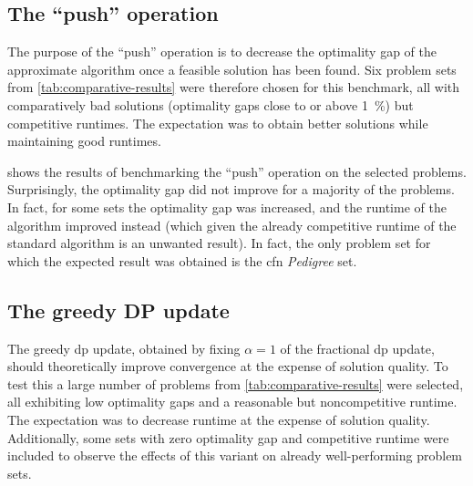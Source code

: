\subsection{The \enquote{push} operation}
The purpose of the \enquote{push} operation is to decrease the optimality gap of the approximate algorithm once a feasible solution has been found.
Six problem sets from \cref{tab:comparative-results} were therefore chosen for this benchmark, all with comparatively bad solutions (optimality gaps close to or above \SI{1}{\percent}) but competitive runtimes.
The expectation was to obtain better solutions while maintaining good runtimes.

 shows the results of benchmarking the \enquote{push} operation on the selected problems.
Surprisingly, the optimality gap did not improve for a majority of the problems.
In fact, for some sets the optimality gap was increased, and the runtime of the algorithm improved instead (which given the already competitive runtime of the standard algorithm is an unwanted result).
In fact, the only problem set for which the expected result was obtained is the \gls{cfn} \emph{Pedigree} set.

\subsection{The greedy DP update}
The greedy \gls{dp} update, obtained by fixing \(\alpha=1\) of the fractional \gls{dp} update, should theoretically improve convergence at the expense of solution quality.
To test this a large number of problems from \cref{tab:comparative-results} were selected, all exhibiting low optimality gaps and a reasonable but noncompetitive runtime.
The expectation was to decrease runtime at the expense of solution quality.
Additionally, some sets with zero optimality gap and competitive runtime were included to observe the effects of this variant on already well-performing problem sets.

